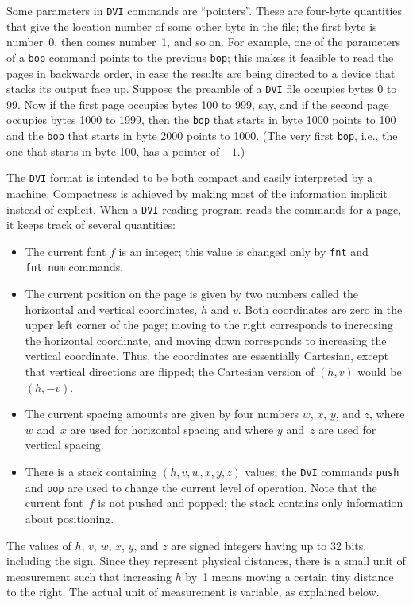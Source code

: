 \documentclass[10pt, a4paper, english]{article}
\begin{document}
Some parameters in \texttt{DVI} commands are ``pointers''. 
These are four-byte quantities that give the location number 
of some other byte in the file; 
the first byte is number~0, then comes number~1, and so on. 
For example, one of the parameters of a \texttt{bop} command 
points to the previous \texttt{bop};
this makes it feasible to read the pages in backwards order, 
in case the results are being directed to a device 
that stacks its output face up. 
Suppose the preamble of a \texttt{DVI} file occupies bytes 0 to 99. 
Now if the first page occupies bytes 100 to 999, say, 
and if the second page occupies bytes 1000 to 1999, 
then the \texttt{bop} that starts in byte 1000
points to 100 and the \texttt{bop} that starts in byte 2000 points to 1000. 
(The very first \texttt{bop}, 
i.e., the one that starts in byte 100, has a pointer of $-1$.)


The  \texttt{DVI} format is intended to be both 
compact and easily interpreted by a machine. 
Compactness is achieved by making most of the information implicit 
instead of explicit. 
When a \texttt{DVI}-reading program reads the commands for a page, 
it keeps track of several quantities: 
%
\begin{itemize}
\item
The current font $f$ is an integer; 
this value is changed only by \texttt{fnt} and \texttt{fnt\_num} commands. 
\item
The current position on the page 
is given by two numbers called the horizontal and vertical coordinates,
$h$ and $v$. 
Both coordinates are zero in the upper left corner of the page; 
moving to the right corresponds to increasing the horizontal coordinate, and
moving down corresponds to increasing the vertical coordinate. 
Thus, the coordinates are essentially Cartesian, 
except that vertical directions are flipped; 
the Cartesian version of $(h,v)$ would be $(h,-v)$.  
\item
The current spacing amounts 
are given by four numbers $w$, $x$, $y$, and $z$,
where $w$ and~$x$ are used for horizontal spacing and where $y$ and~$z$
are used for vertical spacing. 
\item
There is a stack containing $(h,v,w,x,y,z)$ values; 
the \texttt{DVI} commands \texttt{push} and \texttt{pop} are used 
to change the current level of operation. 
Note that the current font~$f$ is not pushed and popped; 
the stack contains only information about positioning.
\end{itemize}

The values of $h$, $v$, $w$, $x$, $y$, and $z$ are signed integers having up
to 32 bits, including the sign. Since they represent physical distances,
there is a small unit of measurement such that increasing $h$ by~1 means
moving a certain tiny distance to the right. The actual unit of
measurement is variable, as explained below. 
\end{document}

